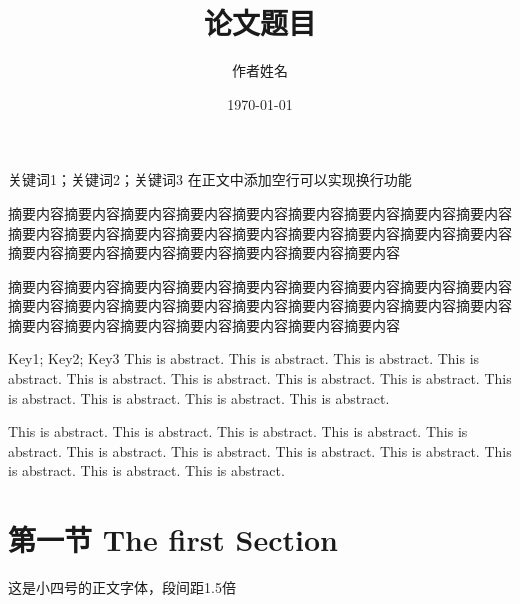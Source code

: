 \documentclass[a4paper,cs4size,UTF8,winfonts,boldfont,slantfont]{ctexart}
\title{论文题目} %
\author{作者姓名} %
\date{\today} %
\begin{document}
	\maketitle
	
	
	\clearpage %
	
	\begin{cnabstract}{关键词1；关键词2；关键词3}
		在正文中添加空行可以实现换行功能
		
		摘要内容摘要内容摘要内容摘要内容摘要内容摘要内容摘要内容摘要内容摘要内容摘要内容摘要内容摘要内容摘要内容摘要内容摘要内容摘要内容摘要内容摘要内容摘要内容摘要内容摘要内容摘要内容摘要内容摘要内容摘要内容
		
		摘要内容摘要内容摘要内容摘要内容摘要内容摘要内容摘要内容摘要内容摘要内容摘要内容摘要内容摘要内容摘要内容摘要内容摘要内容摘要内容摘要内容摘要内容摘要内容摘要内容摘要内容摘要内容摘要内容摘要内容摘要内容
	\end{cnabstract}
	\begin{enabstract}{Key1; Key2; Key3}
		This is abstract. This is abstract. This is abstract. This is abstract. This is abstract. This is abstract. This is abstract. This is abstract. This is abstract. This is abstract. This is abstract. This is abstract. 
		
		This is abstract. This is abstract. This is abstract. This is abstract. This is abstract. This is abstract. This is abstract. This is abstract. This is abstract. This is abstract. This is abstract. This is abstract. 
	\end{enabstract}
	
	\maketoc
	
	\clearpage%
	
	\section{第一节 The first Section}
	这是小四号的正文字体，段间距1.5倍
	
\end{document}
